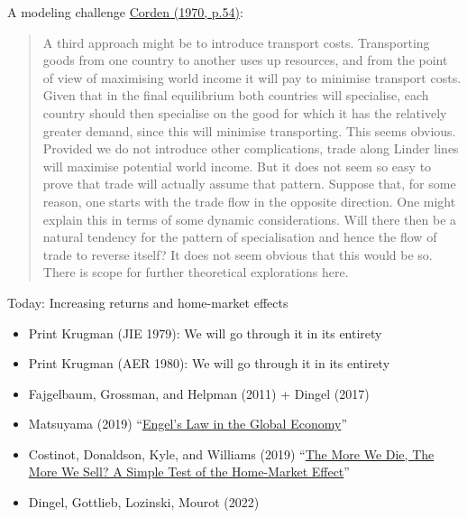 \documentclass[10pt,notes=hide]{beamer}
\begin{document}
\begin{frame}{A modeling challenge}
\href{http://tradediversion.net/2013/10/11/a-prescient-note-on-the-home-market-effect-by-max-corden/}{Corden (1970, p.54)}:
\linespread{1.0}
\begin{quote}
{\small
A third approach might be to introduce transport costs. Transporting goods from one country to another uses up resources, and from the point of view of maximising world income it will pay to minimise transport costs. Given that in the final equilibrium both countries will specialise, each country should then specialise on the good for which it has the relatively greater demand, since this will minimise transporting. This seems obvious. Provided we do not introduce other complications, trade along Linder lines will maximise potential world income. But it does not seem so easy to prove that trade will actually assume that pattern. Suppose that, for some reason, one starts with the trade flow in the opposite direction. One might explain this in terms of some dynamic considerations. Will there then be a natural tendency for the pattern of specialisation and hence the flow of trade to reverse itself? It does not seem obvious that this would be so. There is scope for further theoretical explorations here.
}
\end{quote}
\end{frame}
\begin{frame}{Today: Increasing returns and home-market effects}
\begin{itemize}
\item Print Krugman (JIE 1979): We will go through it in its entirety
\item Print Krugman (AER 1980): We will go through it in its entirety
\item Fajgelbaum, Grossman, and Helpman (2011) + Dingel (2017)
\item Matsuyama (2019) ``\href{https://onlinelibrary-wiley-com.proxy.uchicago.edu/doi/10.3982/ECTA13765}{Engel's Law in the Global Economy}''
\item Costinot, Donaldson, Kyle, and Williams (2019) ``\href{https://academic.oup.com/qje/article/134/2/843/5298504}{The More We Die, The More We Sell? A Simple Test of the Home-Market Effect}''
\item Dingel, Gottlieb, Lozinski, Mourot (2022)
\end{itemize}
\end{frame}
\end{document}
